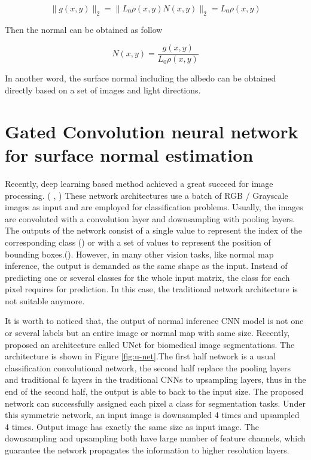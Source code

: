 \documentclass[border=15pt, multi, tikz]{article}
\begin{document}
\[ \|g(x,y)\|_2 = \|L_0\rho(x,y)N(x,y)\|_2 = L_0\rho(x,y) \]

Then the normal can be obtained as follow

\[  N(x,y) = \frac{g(x,y)}{L_0\rho(x,y)}\]

In another word, the surface normal including the albedo can be obtained directly based on a set of images and light directions. 


\section{Gated Convolution neural network for surface normal estimation}
\label{sec:gcnn}


Recently, deep learning based method achieved a great succeed for image processing. ( \cite{yolov3}, \cite{efficientDet}) These network architectures use a batch of RGB / Grayscale images as input and are employed for classification problems. Usually, the images are convoluted with a convolution layer and downsampling with pooling layers. The outputs of the network consist of a single value to represent the index of the corresponding class (\cite{efficientDet}) or with a set of values to represent the position of bounding boxes.(\cite{yolov3}). However, in many other vision tasks, like normal map inference, the output is demanded as the same shape as the input. Instead of predicting one or several classes for the whole input matrix, the class for each pixel requires for prediction. In this case, the traditional network architecture is not suitable anymore.

It is worth to noticed that, the output of normal inference CNN model is not one or several labels but an entire image or normal map with same size. 
Recently,\cite{unet} proposed an architecture called UNet for biomedical image segmentations. The architecture is shown in Figure \ref{fig:u-net}.The first half network is a usual classification convolutional network, the second half replace the pooling layers and traditional fc layers in the traditional CNNs to upsampling layers, thus in the end of the second half, the output is able to back to the input size. The proposed network can successfully assigned each pixel a class for segmentation tasks. Under this symmetric network, an input image is downsampled 4 times and upsampled 4 times. Output image has exactly the same size as input image. The downsampling and upsampling both have large number of feature channels, which guarantee the network propagates the information to higher resolution layers.
\end{document}
